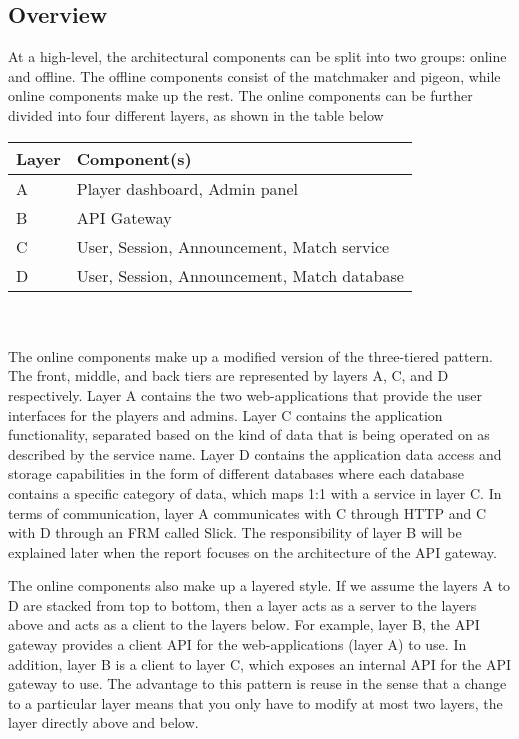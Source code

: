 \documentclass{article}
\begin{document}
\subsection{Overview}
At a high-level, the architectural components can be split into two groups: online and offline. The offline components consist of the matchmaker and pigeon, while online components make up the rest. The online components can be further divided into four different layers, as shown in the table below \\
\begin{tabular}{ | l | l | }
\hline
Layer & Component(s) \\
\hline
A & Player dashboard, Admin panel \\
B & API Gateway \\
C & User, Session, Announcement, Match service \\
D & User, Session, Announcement, Match database \\
\hline
\end{tabular} \\ \\
The online components make up a modified version of the three-tiered pattern. The front, middle, and back tiers are represented by layers A, C, and D respectively. Layer A contains the two web-applications that provide the user interfaces for the players and admins. Layer C contains the application functionality, separated based on the kind of data that is being operated on as described by the service name. Layer D contains the application data access and storage capabilities in the form of different databases where each database contains a specific category of data, which maps 1:1 with a service in layer C. In terms of communication, layer A communicates with C through HTTP and C with D through an FRM called Slick.
The responsibility of layer B will be explained later when the report focuses on the architecture of the API gateway.

The online components also make up a layered style. If we assume the layers A to D are stacked from top to bottom,
then a layer acts as a server to the layers above and acts as a client to the layers below. For example, layer B, the API gateway provides a client API for the web-applications (layer A) to use. In addition, layer B is a client to layer C, which exposes an internal API for the API gateway to use. The advantage to this pattern is reuse in the sense that a change to a particular layer means that you only have to modify at most two layers, the layer directly above and below.
\end{document}
